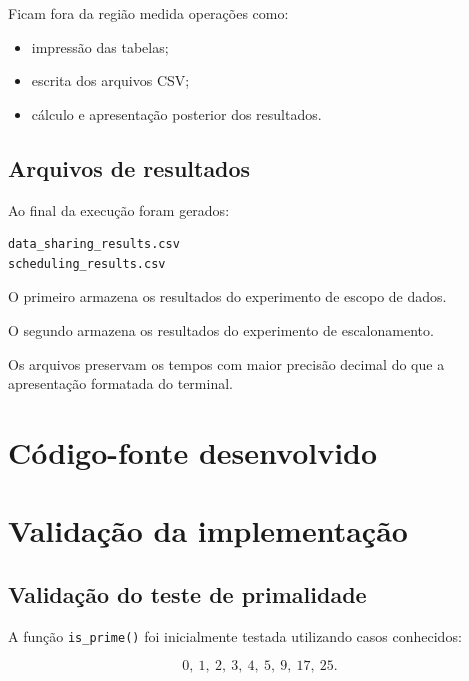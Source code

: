 Ficam fora da região medida operações como:

\begin{itemize}
    \item impressão das tabelas;
    \item escrita dos arquivos CSV;
    \item cálculo e apresentação posterior dos resultados.
\end{itemize}


\subsection{Arquivos de resultados}

Ao final da execução foram gerados:

\begin{verbatim}
data_sharing_results.csv
scheduling_results.csv
\end{verbatim}

O primeiro armazena os resultados do experimento de escopo de dados.

O segundo armazena os resultados do experimento de escalonamento.

Os arquivos preservam os tempos com maior precisão decimal do que a
apresentação formatada do terminal.


\section{Código-fonte desenvolvido}
\label{sec:atvd07-codigo}




\section{Validação da implementação}
\label{sec:atvd07-validacao}

\subsection{Validação do teste de primalidade}

A função \texttt{is\_prime()} foi inicialmente testada utilizando casos
conhecidos:

\[
0,\ 1,\ 2,\ 3,\ 4,\ 5,\ 9,\ 17,\ 25.
\]

